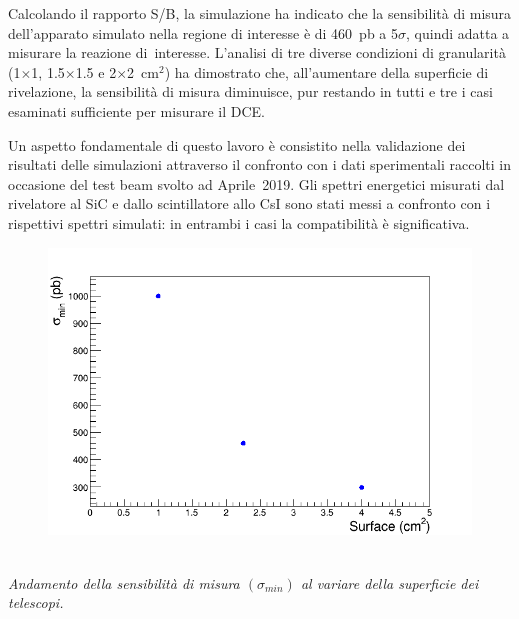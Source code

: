 \documentclass[10pt,foldmark,notumble]{leaflet}
\begin{document}
Calcolando il rapporto S/B, la simulazione ha indicato che la sensibilità di misura dell'apparato simulato nella regione di interesse è di 460~pb a 5$\sigma$, quindi adatta a misurare la reazione di~interesse.
L'analisi di tre diverse condizioni di granularità (1$\times$1, 1.5$\times$1.5 e 2$\times$2~$\mbox{cm}^2$) ha dimostrato che, all'aumentare della superficie di rivelazione, la sensibilità di misura diminuisce, pur restando in tutti e tre i casi esaminati sufficiente per misurare il DCE.

Un aspetto fondamentale di questo lavoro è consistito nella validazione dei risultati delle simulazioni attraverso il confronto con i dati sperimentali raccolti in occasione del test beam svolto ad Aprile~2019.
Gli spettri energetici misurati dal rivelatore al SiC e dallo scintillatore allo CsI sono stati messi a confronto con i rispettivi spettri simulati: in entrambi i casi la compatibilità è significativa.
\begin{figure} [!h]
	\centering
	\includegraphics[width=0.7\columnwidth, keepaspectratio]{Grafici_Tesi2/Granularitanew/sigma_min.png}
\end{figure}\\
\textit{Andamento della sensibilità di misura $(\sigma_{min})$ al variare della superficie dei telescopi.}\\
\end{document}
